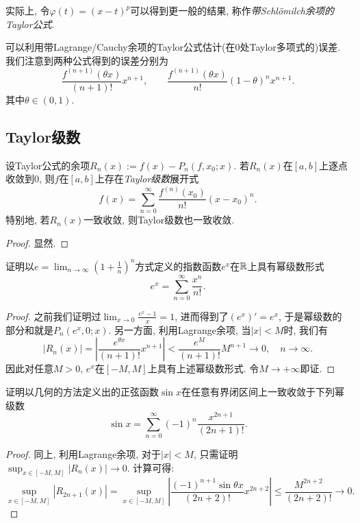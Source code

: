 实际上, 令$\varphi (t) = (x-t)^p$可以得到更一般的结果, 称作\textit{带Schlömilch余项的Taylor公式}. 

可以利用带Lagrange/Cauchy余项的Taylor公式估计(在$0$处Taylor多项式的)误差. 我们注意到两种公式得到的误差分别为$$\frac{f^{(n+1)}(\theta x)}{(n+1)!} x^{n+1},\qquad \frac{f^{(n+1)}(\theta x)}{n!}(1-\theta)^n x^{n+1}.$$
其中$\theta \in (0,1)$. 

\subsection{Taylor级数}

\begin{theorem}{}
	设Taylor公式的余项$R_n(x):=f(x)-P_n(f,x_0;x)$. 若$R_n(x)$在$[a,b]$上逐点收敛到$0$, 则$f$在$[a,b]$上存在\textit{Taylor级数}展开式$$f(x) = \sum_{n=0}^{\infty} \frac{f^{(n)}(x_0)}{n!} (x-x_0)^n.$$
	特别地, 若$R_n(x)$一致收敛, 则Taylor级数也一致收敛. 
\end{theorem}
\begin{proof}
	显然. 
\end{proof}

\begin{example}
	证明以$e=\lim_{n\to \infty} (1+\frac{1}{n})^n$方式定义的指数函数$e^x$在$\mathbb{R}$上具有幂级数形式$$e^x = \sum_{n=0}^{\infty} \frac{x^n}{n!}. $$
\end{example}
\begin{proof}
	之前我们证明过$\lim_{x \to 0} \frac{e^x-1}{x}=1$, 进而得到了$(e^x)'=e^x$, 于是幂级数的部分和就是$P_n(e^x,0;x)$. 另一方面, 利用Lagrange余项, 当$|x|<M$时, 我们有$$|R_n(x)| = \left| \frac{e^{\theta x}}{(n+1)!} x^{n+1} \right| < \frac{e^M}{(n+1)!}M^{n+1} \to 0,\quad n \to \infty .$$
	因此对任意$M>0$, $e^x$在$[-M,M]$上具有上述幂级数形式. 令$M \to +\infty$即证. 
\end{proof}

\begin{example}
	证明以几何的方法定义出的正弦函数$\sin x$在任意有界闭区间上一致收敛于下列幂级数$$\sin x = \sum_{n=0}^{\infty} (-1)^n \frac{x^{2n+1}}{(2n+1)!}.$$
\end{example}
\begin{proof}
	同上, 利用Lagrange余项, 对于$|x|<M$, 只需证明$\sup_{x \in [-M,M]} |R_n(x)| \to 0$. 计算可得: $$\sup_{x \in [-M,M]} |R_{2n+1}(x)| = \sup_{x \in [-M,M]} \left| \frac{(-1)^{n+1}\sin \theta x}{(2n+2)!} x^{2n+2} \right| \leq \frac{M^{2n+2}}{(2n+2)!} \to 0.$$
\end{proof}

